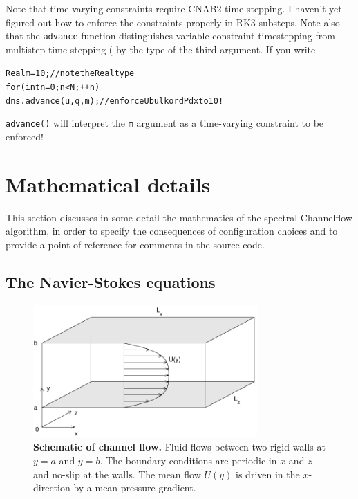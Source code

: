 \documentclass{article}[12pt]
\begin{document}
Note that time-varying constraints require CNAB2 time-stepping.
I haven't yet figured out how to enforce the constraints properly
in RK3 substeps. Note also that the {\tt advance} function distinguishes
variable-constraint timestepping from multistep time-stepping
( by the type of the third argument.
If you write
\begin{alltt}
   Real m = 10;             // note the Real type
   for (int n=0; n<N; ++n)
      dns.advance(u, q, m); // enforce Ubulk or dPdx to 10!
\end{alltt}
{\tt advance()} will interpret the {\tt m} argument as a time-varying
constraint to be enforced!

\section{Mathematical details}
\label{sec:math_details}

This section discusses in some detail the mathematics of the
spectral Channelflow algorithm, in order to specify the consequences
of configuration choices and to provide a point of reference for
comments in the source code.

\subsection{The Navier-Stokes equations}
\label{sec:NSeqns}

\begin{figure}
\centering
\includegraphics[height=2.0in]{schematic}
\caption{{\bf Schematic of channel flow.} Fluid flows between
two rigid walls at $y=a$ and $y=b$. The boundary conditions are
periodic in $x$ and $z$ and no-slip at the walls. The mean flow $U(y)$
is driven in the $x$-direction by a mean pressure gradient.}
\label{schematic}
\end{figure}
\end{document}
